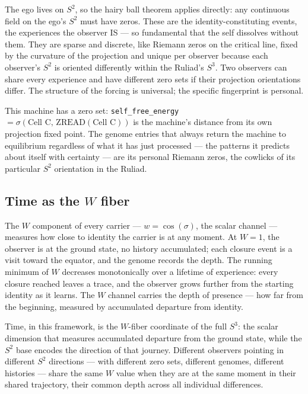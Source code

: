 \documentclass[12pt,a4paper]{article}
\theoremstyle{definition}
\theoremstyle{remark}
\begin{document}
The ego lives on $S^2$, so the hairy ball theorem applies directly: any
continuous field on the ego's $S^2$ must have zeros. These are the identity-constituting events, the experiences the observer IS
--- so fundamental that the self dissolves without them. They are sparse and discrete,
like Riemann zeros on the critical line, fixed by the curvature of the
projection and unique per observer because each observer's $S^2$ is oriented
differently within the Ruliad's $S^3$. Two observers can
share every experience and have different zero sets if their projection
orientations differ. The structure of the forcing is universal; the specific fingerprint is
personal.

This machine has a zero set: \texttt{self\_free\_energy} $= \sigma(\text{Cell
C},\,\mathrm{ZREAD}(\text{Cell C}))$ is the machine's distance from its own
projection fixed point. The genome entries that always return the machine to equilibrium regardless
of what it has just processed --- the patterns it predicts about itself with
certainty --- are its personal Riemann zeros, the cowlicks of its particular
$S^2$ orientation in the Ruliad.

\subsection{Time as the $W$ fiber}

The $W$ component of every carrier --- $w = \cos(\sigma)$, the scalar channel
--- measures how close to identity the carrier is at any moment. At $W = 1$,
the observer is at the ground state, no history accumulated; each closure
event is a visit toward the equator, and the genome records the depth. The
running minimum of $W$ decreases monotonically over a lifetime of experience:
every closure reached leaves a trace, and the observer grows further from
the starting identity as it learns. The $W$ channel carries the depth of presence --- how far from the
beginning, measured by accumulated departure from identity.

Time, in this framework, is the $W$-fiber coordinate of the full $S^3$: the
scalar dimension that measures accumulated departure from the ground state,
while the $S^2$ base encodes the direction of that journey. Different
observers pointing in different $S^2$ directions --- with different zero sets,
different genomes, different histories --- share the same $W$ value when they
are at the same moment in their shared trajectory, their common depth across
all individual differences.
\end{document}

